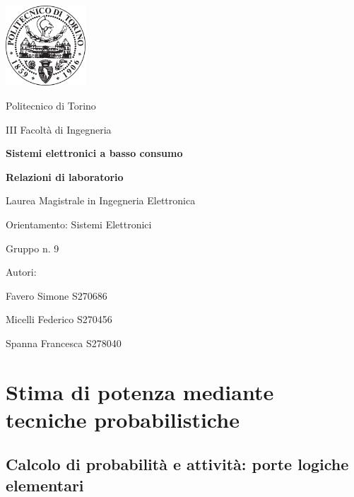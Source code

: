\documentclass[11pt,  english, makeidx, a4paper, titlepage, oneside]{book}
\begin{document}
\begin{titlepage}

	\centerline{\includegraphics[width=3cm]{./img/general/polito.png}}
	\vspace{0.3cm}
	\centerline{\Large{Politecnico di Torino}}
	\vspace{0.3cm}
	\centerline{\Large{III Facoltà di Ingegneria}}
	\vspace{3cm}
	\centerline{\Huge\textbf{Sistemi elettronici a basso consumo}}
	\vspace{1cm}
	\centerline{\LARGE\textbf{Relazioni di laboratorio}}
	\vspace{3cm}
	\centerline{\LARGE{Laurea Magistrale in Ingegneria Elettronica}}
	\vspace{0.3cm}
	\centerline{\LARGE{Orientamento: Sistemi Elettronici}}
	\vspace{3cm}
	\centerline{\Large{Gruppo n. 9}}
	\vspace{2cm}
	\centerline{\Large{Autori:}}
	\vspace{0.3cm}
	\centerline{\Large{Favero Simone S270686}}
	\centerline{\Large{Micelli Federico S270456}}
	\centerline{\Large{Spanna Francesca S278040}}
	
\end{titlepage}

\tableofcontents %
\pagebreak %

\chapter{Stima di potenza mediante tecniche probabilistiche}

\section{Calcolo di probabilità e attività: porte logiche elementari}
\end{document}
